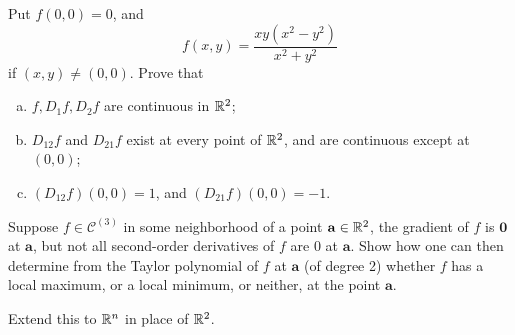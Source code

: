 \begin{myExercise}
    \label{ex:9.27}
    Put $f(0,0)=0$, and 
    \begin{equation*}
        f(x,y) = \frac{xy(x^2-y^2)}{x^2+y^2}
    \end{equation*}
    if $(x,y) \neq (0,0)$.
    Prove that 
    \begin{enumerate}[(a)]
        \item $f, D_1 f, D_2 f$ are continuous in ${\protect\mathbb R}^2$;
        \item $D_{12}f$ and $D_{21}f$ exist at every point of ${\protect\mathbb R}^2$, and are continuous except at $(0, 0)$;
        \item $(D_{12}f)(0,0)=1$, and $(D_{21}f)(0,0)=-1$.
    \end{enumerate}
\end{myExercise}


\begin{myExercise}
    \label{ex:9.28}
\end{myExercise}


\begin{myExercise}
    \label{ex:9.29}
\end{myExercise}


\begin{myExercise}
    \label{ex:9.30}
\end{myExercise}


\begin{myExercise}
    \label{ex:9.31}
    Suppose $f \in \mathscr{C}^{(3)}$ in some neighborhood of a point $\mathbf{a} \in {\protect\mathbb R}^2$, the gradient of $f$ is $\mathbf{0}$ at $\mathbf{a}$, but not all second-order derivatives of $f$ are 0 at $\mathbf{a}$. 
    Show how one can then determine from the Taylor polynomial of $f$ at $\mathbf{a}$ (of degree 2) whether $f$ has a local maximum, or a local minimum, or neither, at the point $\mathbf{a}$. 
    
    Extend this to ${\protect\mathbb R}^n$ in place of ${\protect\mathbb R}^2$.
\end{myExercise}